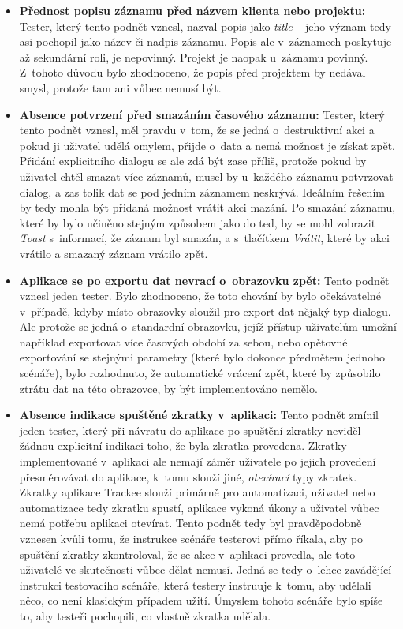 \begin{itemize}
\item\textbf{Přednost popisu záznamu před názvem klienta nebo projektu:} Tester, který tento podnět vznesl, nazval popis jako \emph{title} – jeho význam tedy asi pochopil jako název či nadpis záznamu. Popis ale v~záznamech poskytuje až sekundární roli, je nepovinný. Projekt je naopak u~záznamu povinný. Z~tohoto důvodu bylo zhodnoceno, že popis před projektem by nedával smysl, protože tam ani vůbec nemusí být.
\item\textbf{Absence potvrzení před smazáním časového záznamu:} Tester, který tento podnět vznesl, měl pravdu v~tom, že se jedná o~destruktivní akci a pokud ji uživatel udělá omylem, přijde o~data a nemá možnost je získat zpět. Přidání explicitního dialogu se ale zdá být zase příliš, protože pokud by uživatel chtěl smazat více záznamů, musel by u~každého záznamu potvrzovat dialog, a zas tolik dat se pod jedním záznamem neskrývá. Ideálním řešením by tedy mohla být přidaná možnost vrátit akci mazání. Po smazání záznamu, které by bylo učiněno stejným způsobem jako do teď, by se mohl zobrazit \emph{Toast} s~informací, že záznam byl smazán, a s~tlačítkem \emph{Vrátit}, které by akci vrátilo a smazaný záznam vrátilo zpět.
\item\textbf{Aplikace se po exportu dat nevrací o~obrazovku zpět:} Tento podnět vznesl jeden tester. Bylo zhodnoceno, že toto chování by bylo očekávatelné v~případě, kdyby místo obrazovky sloužil pro export dat nějaký typ dialogu. Ale protože se jedná o~standardní obrazovku, jejíž přístup uživatelům umožní například exportovat více časových období za sebou, nebo opětovné exportování se stejnými parametry (které bylo dokonce předmětem jednoho scénáře), bylo rozhodnuto, že automatické vrácení zpět, které by způsobilo ztrátu dat na této obrazovce, by být implementováno nemělo.
\item\textbf{Absence indikace spuštěné zkratky v~aplikaci:} Tento podnět zmínil jeden tester, který při návratu do aplikace po spuštění zkratky neviděl žádnou explicitní indikaci toho, že byla zkratka provedena. Zkratky implementované v~aplikaci ale nemají záměr uživatele po jejich provedení přesměrovávat do aplikace, k~tomu slouží jiné, \emph{otevírací} typy zkratek. Zkratky aplikace Trackee slouží primárně pro automatizaci, uživatel nebo automatizace tedy zkratku spustí, aplikace vykoná úkony a uživatel vůbec nemá potřebu aplikaci otevírat. Tento podnět tedy byl pravděpodobně vznesen kvůli tomu, že instrukce scénáře testerovi přímo říkala, aby po spuštění zkratky zkontroloval, že se akce v~aplikaci provedla, ale toto uživatelé ve skutečnosti vůbec dělat nemusí. Jedná se tedy o~lehce zavádějící instrukci testovacího scénáře, která testery instruuje k~tomu, aby udělali něco, co není klasickým případem užití. Úmyslem tohoto scénáře bylo spíše to, aby testeři pochopili, co vlastně zkratka udělala.

\end{itemize}
